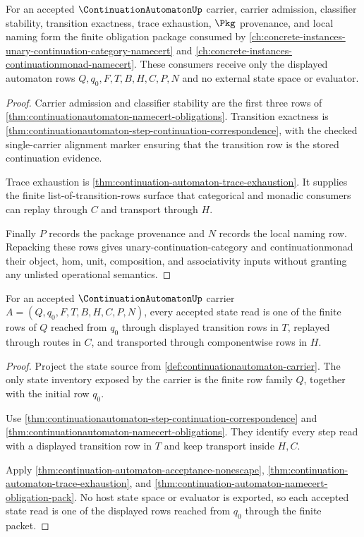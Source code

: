 \begin{theorem}\label{thm:continuation-automaton-namecert-obligation-pack}
For an accepted $\ContinuationAutomatonUp$ carrier, carrier admission, classifier stability, transition exactness, trace exhaustion, $\Pkg$ provenance, and local naming form the finite obligation package consumed by \autoref{ch:concrete-instances-unary-continuation-category-namecert} and \autoref{ch:concrete-instances-continuationmonad-namecert}. These consumers receive only the displayed automaton rows $Q,q_0,F,T,B,H,C,P,N$ and no external state space or evaluator.
\end{theorem}
\begin{proof}
Carrier admission and classifier stability are the first three rows of \autoref{thm:continuationautomaton-namecert-obligations}. Transition exactness is \autoref{thm:continuationautomaton-step-continuation-correspondence}, with the checked single-carrier alignment marker ensuring that the transition row is the stored continuation evidence.

Trace exhaustion is \autoref{thm:continuation-automaton-trace-exhaustion}. It supplies the finite list-of-transition-rows surface that categorical and monadic consumers can replay through $C$ and transport through $H$.

Finally $P$ records the package provenance and $N$ records the local naming row. Repacking these rows gives unary-continuation-category and continuationmonad their object, hom, unit, composition, and associativity inputs without granting any unlisted operational semantics.
\end{proof}

\begin{theorem}\label{thm:continuation-automaton-state-source-determinacy}
For an accepted $\ContinuationAutomatonUp$ carrier $A=(Q,q_0,F,T,B,H,C,P,N)$,
every accepted state read is one of the finite rows of $Q$ reached from $q_0$
through displayed transition rows in $T$, replayed through routes in $C$, and
transported through componentwise rows in $H$.
\end{theorem}
\begin{proof}
Project the state source from \autoref{def:continuationautomaton-carrier}.
The only state inventory exposed by the carrier is the finite row family $Q$,
together with the initial row $q_0$.

Use \autoref{thm:continuationautomaton-step-continuation-correspondence} and
\autoref{thm:continuationautomaton-namecert-obligations}. They identify every
step read with a displayed transition row in $T$ and keep transport inside
$H,C$.

Apply \autoref{thm:continuation-automaton-acceptance-nonescape},
\autoref{thm:continuation-automaton-trace-exhaustion}, and
\autoref{thm:continuation-automaton-namecert-obligation-pack}. No host state
space or evaluator is exported, so each accepted state read is one of the
displayed rows reached from $q_0$ through the finite packet.
\end{proof}

